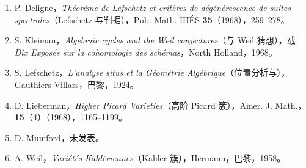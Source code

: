 \begin{enumerate}
\item[{[1]}] P. Deligne，\emph{Théorème de Lefschetz et critères de dégénérescence de suites spectrales}（Lefschetz 与判据），Pub. Math. IHÉS \textbf{35}（1968），259--278。
\item[{[2]}] S. Kleiman，\emph{Algebraic cycles and the Weil conjectures}（与 Weil 猜想），载 \emph{Dix Exposés sur la cohomologie des schémas}，North Holland，1968。
\item[{[3]}] S. Lefschetz，\emph{L'analyse situs et la Géométrie Algébrique}（位置分析与），Gauthiers-Villars，巴黎，1924。
\item[{[4]}] D. Lieberman，\emph{Higher Picard Varieties}（高阶 Picard 簇），Amer. J. Math.，\textbf{15}（4）（1968），1165--1199。
\item[{[5]}] D. Mumford，未发表。
\item[{[6]}] A. Weil，\emph{Variétés Kählériennes}（Kähler 簇），Hermann，巴黎，1958。
\end{enumerate}
